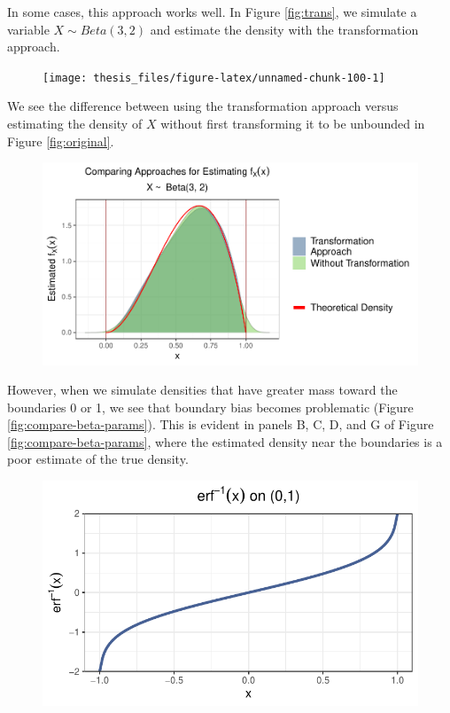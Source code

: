 \documentclass[12pt,twoside]{smiththesis}
\begin{document}
In some cases, this approach works well. In Figure \ref{fig:trans}, we simulate a variable \(X \sim Beta(3,2)\) and estimate the density with the transformation approach.
\begin{figure}

{\centering \texttt{[image: thesis\_files/figure-latex/unnamed-chunk-100-1]} 

}

\caption{\label{fig:trans}}\label{fig:unnamed-chunk-100}
\end{figure}
We see the difference between using the transformation approach versus estimating the density of \(X\) without first transforming it to be unbounded in Figure \ref{fig:original}.
\begin{figure}

{\centering \includegraphics[width=1\linewidth]{thesis_files/figure-latex/create-fig-original-1} 

}

\caption{\label{fig:original}}\label{fig:create-fig-original}
\end{figure}
However, when we simulate densities that have greater mass toward the boundaries 0 or 1, we see that boundary bias becomes problematic (Figure \ref{fig:compare-beta-params}). This is evident in panels B, C, D, and G of Figure \ref{fig:compare-beta-params}, where the estimated density near the boundaries is a poor estimate of the true density.
\begin{figure}

{\centering \includegraphics[width=1\linewidth]{thesis_files/figure-latex/unnamed-chunk-102-1} 

}

\caption{\label{fig:compare-beta-params}}\label{fig:unnamed-chunk-102}
\end{figure}
\newpage
\end{document}
